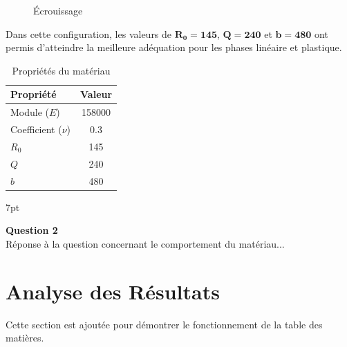 \documentclass[11pt,a4paper]{article}
\newenvironment{formal}{%
\def\FrameCommand{%
  \hspace{1pt}%
  {\color{enstaBleuFonce}\vrule width 2pt}%
  {\color{formalshade}\vrule width 4pt}%
  \colorbox{formalshade}%
}%
\MakeFramed{\advance\hsize-\width\FrameRestore}%
\noindent\hspace{-4.55pt}%
\begin{adjustwidth}{}{7pt}%
\vspace{4pt}%
}{%
\vspace{4pt}\end{adjustwidth}\endMakeFramed%
}
\begin{document}
\begin{figure}[H]
    \centering
    \caption{Écrouissage }
    \label{fig:ecrouissage}
\end{figure}

Dans cette configuration, les valeurs de $\mathbf{R_0 = 145}$, $\mathbf{Q = 240}$ et $\mathbf{b = 480}$ ont permis d'atteindre la meilleure adéquation pour les phases linéaire et plastique. \\

\begin{table}[H]
    \centering
    \begin{tabular}{l c}
        \toprule
        \textbf{Propriété} & \textbf{Valeur} \\
        \midrule
        Module  ($E$) & \num{158000} \\ 
        Coefficient ($\nu$) & 0.3 \\
        $R_0$ & 145 \\ 
        $Q$ & 240 \\ 
        $b$ & 480 \\
        \bottomrule
    \end{tabular}
    
    \caption{Propriétés du matériau}
    \label{tab:material_propertiesTAB5}
\end{table}

\begin{formal}
    \textbf{Question 2}\\
    Réponse à la question concernant le comportement du matériau...
\end{formal}

\section{Analyse des Résultats}
Cette section est ajoutée pour démontrer le fonctionnement de la table des matières.
\end{document}
